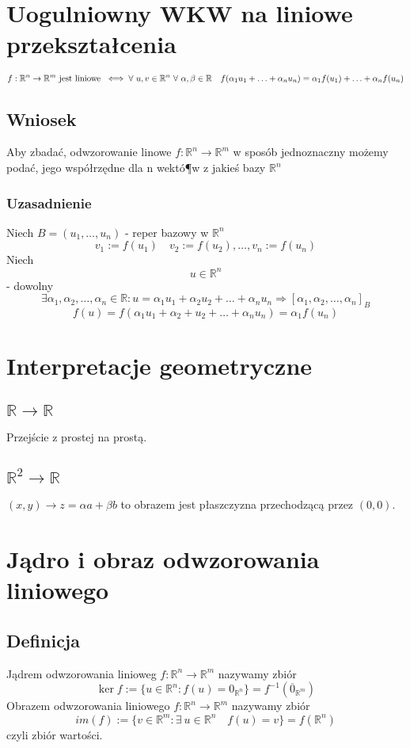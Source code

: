 \documentclass[11pt]{article}
\begin{document}
\section{Uogulniowny WKW na liniowe przekształcenia}
$$f : \mathbb{R}^n \to \mathbb{R}^m \hbox{ jest liniowe } \iff \forall\ u,v \in \mathbb{R}^n\ \forall\ \alpha, \beta \in \mathbb{R} \quad f(\alpha_1 u_1 + \ldots + \alpha_n u_n) = \alpha_1 f(u_1)+ \ldots + \alpha_n f(u_n)$$

\subsection{Wniosek}
Aby zbadać, odwzorowanie linowe $f : \mathbb{R}^n \to \mathbb{R}^m$ w sposób jednoznaczny możemy podać, jego współrzędne dla n wektó¶w z jakieś bazy $\mathbb{R}^n$
\subsubsection{Uzasadnienie}
Niech $B = (u_1,\ldots,u_n)$ - reper bazowy w $\mathbb{R}^n$ 
$$v_1 := f(u_1)\quad v_2 := f(u_2) , \ldots , v_n := f(u_n) $$
Niech $$ u \in \mathbb{R}^n $$ - dowolny 
$$ \exists \alpha_1, \alpha_2 ,\ldots , \alpha_n  \in \mathbb{R} : u = \alpha_1 u_1 + \alpha_2 u_2 + \ldots + \alpha_n u_n \Longrightarrow [\alpha_1,\alpha_2, \ldots , \alpha_n]_B $$
$$ f(u) = f(\alpha_1 u_1 + \alpha_2 + u_2 + \ldots + \alpha_n u_n) = \alpha_1 f(u_n)$$

\section{Interpretacje geometryczne}
\subsection{$\mathbb{R} \to \mathbb{R}$}
Przejście z prostej na prostą.
\subsection{$\mathbb{R}^2 \to \mathbb{R}$}
$(x,y) \to z =  \alpha a + \beta b $ to obrazem jest płaszczyzna przechodzącą przez $(0,0)$.

\section{Jądro i obraz odwzorowania liniowego}
\subsection{Definicja}
Jądrem odwzorowania linioweg $f : \mathbb{R}^n \to \mathbb{R}^m$ nazywamy zbiór $$ \ker f :=  \{ u \in \mathbb{R}^n : f(u) = 0_{\mathbb{R}^n}\} = f^{-1}(\overline{0}_{\mathbb{R}^m})$$
Obrazem odwzorowania liniowego $f : \mathbb{R}^n \to \mathbb{R}^m$ nazywamy zbiór $$ im(f) := \{ v \in \mathbb{R}^m : \exists\ u \in \mathbb{R}^n \quad f(u) = v \} = f(\mathbb{R}^n)$$
czyli zbiór wartości.
\end{document}
